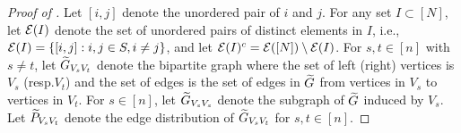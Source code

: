 \begin{proof}[Proof of ]
Let $[i,j]$ denote the unordered pair of $i$ and $j$.
For any set $I \subset [N]$, let ${\mathcal{E}}(I)$ denote the set of unordered pairs of distinct elements in $I$, i.e., ${\mathcal{E}}(I)=\{[i,j]: i,j \in S, i\neq j\}$, and let ${\mathcal{E}}(I)^c={\mathcal{E}}( [N] ) \setminus {\mathcal{E}}(I)$.
For $s, t \in [n]$ with $s \neq t$, let ${\widetilde{G}}_{V_sV_t}$ denote the bipartite graph where the set of left (right) vertices is $V_s$ (resp.\xspace $V_t$) and the set of edges is the set of edges in ${\widetilde{G}}$ from vertices in $V_s$ to vertices in $V_t$. For $s \in [n]$, let ${\widetilde{G}}_{V_sV_s}$ denote the subgraph of ${\widetilde{G}}$ induced by $V_s$. Let ${\widetilde{P}}_{V_sV_t}$ denote the edge distribution of ${\widetilde{G}}_{V_sV_t}$ for $s, t \in [n]$.



\end{proof}
